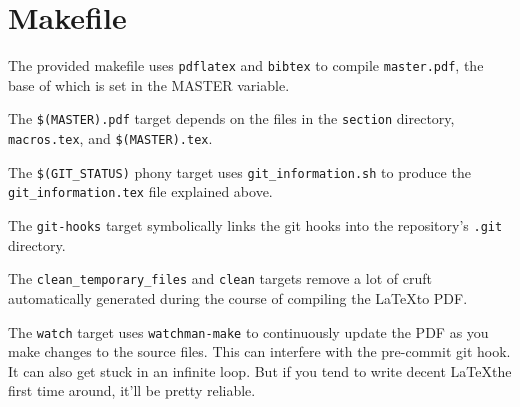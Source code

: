 \section{Makefile}

The provided makefile uses \texttt{pdflatex} and \texttt{bibtex} to compile \texttt{master.pdf}, the base of which is set in the MASTER variable.

The \texttt{\$(MASTER).pdf} target depends on the files in the \texttt{section} directory, \texttt{macros.tex}, and \texttt{\$(MASTER).tex}.

The \texttt{\$(GIT\_STATUS)} phony target uses \texttt{git\_information.sh} to produce the \texttt{git\_information.tex} file explained above.

The \texttt{git-hooks} target symbolically links the git hooks into the repository's \texttt{.git} directory.

The \texttt{clean\_temporary\_files} and \texttt{clean} targets remove a lot of cruft automatically generated during the course of compiling the \LaTeX to PDF.

The \texttt{watch} target uses \texttt{watchman-make}\cite{watchman} to continuously update the PDF as you make changes to the source files.
This can interfere with the pre-commit git hook.
It can also get stuck in an infinite loop.
But if you tend to write decent \LaTeX the first time around, it'll be pretty reliable.

